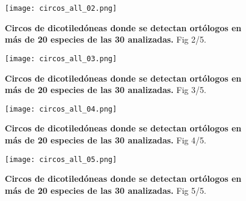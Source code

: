 \begin{landscape}
    \begin{figure}[htbp!] 
        \centering    
        \texttt{[image: circos\_all\_02.png]}
        \caption[Circos de dicotiledóneas (en más de 20 especies). 2/5]{
        \textbf{Circos de dicotiledóneas donde se detectan ortólogos en más de 20 especies de las 30 analizadas.}
        Fig 2/5.
        }
        \label{fig:circos_all_02}
    \end{figure}
\end{landscape}

\begin{landscape}
    \begin{figure}[htbp!] 
        \centering    
        \texttt{[image: circos\_all\_03.png]}
        \caption[Circos de dicotiledóneas (en más de 20 especies). 3/5]{
        \textbf{Circos de dicotiledóneas donde se detectan ortólogos en más de 20 especies de las 30 analizadas.}
        Fig 3/5.
        }
        \label{fig:circos_all_03}
    \end{figure}
\end{landscape}

\begin{landscape}
    \begin{figure}[htbp!] 
        \centering    
        \texttt{[image: circos\_all\_04.png]}
        \caption[Circos de dicotiledóneas (en más de 20 especies). 4/5]{
        \textbf{Circos de dicotiledóneas donde se detectan ortólogos en más de 20 especies de las 30 analizadas.}
        Fig 4/5.
        }
        \label{fig:circos_all_04}
    \end{figure}
\end{landscape}

\begin{landscape}
    \begin{figure}[htbp!] 
        \centering    
        \texttt{[image: circos\_all\_05.png]}
        \caption[Circos de dicotiledóneas (en más de 20 especies). 5/5]{
        \textbf{Circos de dicotiledóneas donde se detectan ortólogos en más de 20 especies de las 30 analizadas.}
        Fig 5/5.
        }
        \label{fig:circos_all_05}
    \end{figure}
\end{landscape}



